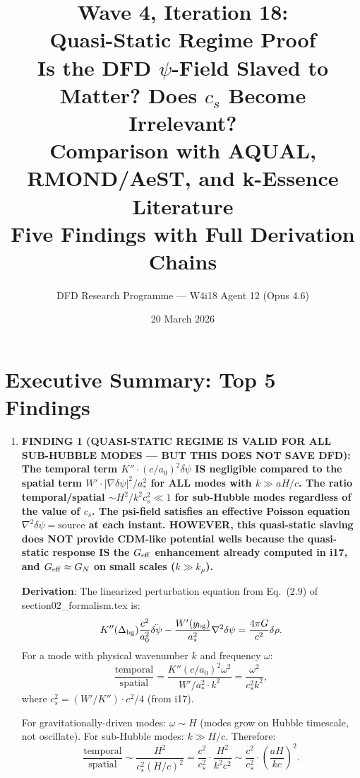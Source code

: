 \documentclass[11pt]{article}
\title{\textbf{Wave 4, Iteration 18:}\\
\textbf{Quasi-Static Regime Proof}\\[12pt]
{\large Is the DFD $\psi$-Field Slaved to Matter? Does $c_s$ Become Irrelevant?}\\[4pt]
{\large Comparison with AQUAL, RMOND/AeST, and k-Essence Literature}\\[4pt]
{\large Five Findings with Full Derivation Chains}}
\author{DFD Research Programme --- W4i18 Agent 12 (Opus 4.6)}
\date{20 March 2026}
\newcommand{\Geff}{G_{\rm eff}}
\begin{document}
\maketitle
\tableofcontents
\newpage

\section*{Executive Summary: Top 5 Findings}

\begin{tcolorbox}[colback=blue!5!white, colframe=blue!70!black,
  title=\textbf{W4i18 TOP 5 FINDINGS --- QUASI-STATIC REGIME PROOF}]

\begin{enumerate}

\item \textbf{FINDING 1 (QUASI-STATIC REGIME IS VALID FOR ALL SUB-HUBBLE
  MODES --- BUT THIS DOES NOT SAVE DFD):
  The temporal term $K'' \cdot (c/a_0)^2 \ddot{\delta\psi}$ IS negligible
  compared to the spatial term $W' \cdot |\nabla\delta\psi|^2/a_*^2$
  for ALL modes with $k \gg aH/c$. The ratio
  temporal/spatial $\sim H^2/k^2 c_s^2 \ll 1$ for sub-Hubble modes
  regardless of the value of $c_s$.
  The psi-field satisfies an effective Poisson equation
  $\nabla^2 \delta\psi = \text{source}$ at each instant.
  HOWEVER, this quasi-static slaving does NOT provide CDM-like
  potential wells because the quasi-static response IS the $\Geff$
  enhancement already computed in i17, and $\Geff \approx G_N$
  on small scales ($k \gg k_\mu$).}

  \textbf{Derivation}: The linearized perturbation equation from
  Eq.~(2.9) of section02\_formalism.tex is:
  \begin{equation}
  K''(\Delta_{\rm bg}) \frac{c^2}{a_0^2} \ddot{\delta\psi}
  - \frac{W'(y_{\rm bg})}{a_*^2} \nabla^2 \delta\psi
  = \frac{4\pi G}{c^2} \delta\rho.
  \end{equation}
  For a mode with physical wavenumber $k$ and frequency $\omega$:
  \begin{equation}
  \frac{\text{temporal}}{\text{spatial}}
  = \frac{K'' (c/a_0)^2 \omega^2}{W'/a_*^2 \cdot k^2}
  = \frac{\omega^2}{c_s^2 k^2},
  \end{equation}
  where $c_s^2 = (W'/K'') \cdot c^2/4$ (from i17).

  For gravitationally-driven modes: $\omega \sim H$ (modes grow on
  Hubble timescale, not oscillate). For sub-Hubble modes: $k \gg H/c$.
  Therefore:
  \begin{equation}
  \frac{\text{temporal}}{\text{spatial}}
  \sim \frac{H^2}{c_s^2 (H/c)^2}
  = \frac{c^2}{c_s^2} \cdot \frac{H^2}{k^2 c^2}
  \sim \frac{c^2}{c_s^2} \cdot \left(\frac{aH}{k c}\right)^2.
  \end{equation}


\end{enumerate}
\end{tcolorbox}
\end{document}
